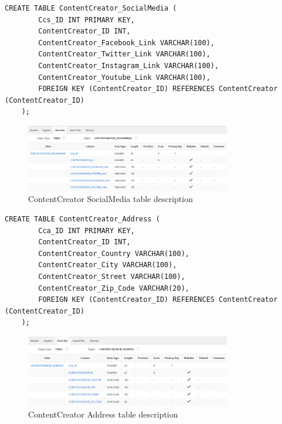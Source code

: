 \begin{lstlisting}[caption={Create ContentCreator SocialMedia table}, label={lst:create_contentcreator_socialmedia}]
    CREATE TABLE ContentCreator_SocialMedia (
        Ccs_ID INT PRIMARY KEY,
        ContentCreator_ID INT,
        ContentCreator_Facebook_Link VARCHAR(100),
        ContentCreator_Twitter_Link VARCHAR(100),
        ContentCreator_Instagram_Link VARCHAR(100),
        ContentCreator_Youtube_Link VARCHAR(100),
        FOREIGN KEY (ContentCreator_ID) REFERENCES ContentCreator (ContentCreator_ID)
    );
    \end{lstlisting}
\begin{figure}[H]
    \centering
    \includegraphics[width=0.8\textwidth]{images/TableDesc/CONTENTCREATOR_SOCIALMEDIA.png}
    \caption{ContentCreator SocialMedia table description}
    \label{fig:contentcreator_socialmedia_table}
\end{figure}
\begin{lstlisting}[caption={Create ContentCreator Address table}, label={lst:create_contentcreator_address}]
    CREATE TABLE ContentCreator_Address (
        Cca_ID INT PRIMARY KEY,
        ContentCreator_ID INT,
        ContentCreator_Country VARCHAR(100),
        ContentCreator_City VARCHAR(100),
        ContentCreator_Street VARCHAR(100),
        ContentCreator_Zip_Code VARCHAR(20),
        FOREIGN KEY (ContentCreator_ID) REFERENCES ContentCreator (ContentCreator_ID)
    );
    \end{lstlisting}
\begin{figure}[H]
    \centering
    \includegraphics[width=0.8\textwidth]{images/TableDesc/CONTENTCREATOR_ADDRESS.png}
    \caption{ContentCreator Address table description}
    \label{fig:contentcreator_address_table}
\end{figure}
